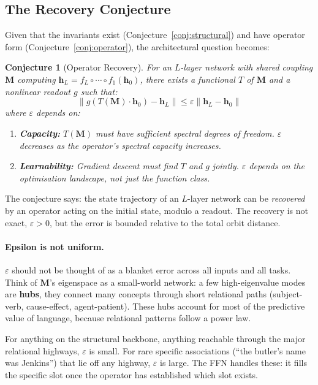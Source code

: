 \documentclass[11pt, a4paper]{article}
\newcommand{\M}{\mathbf{M}}
\newcommand{\h}{\mathbf{h}}
\newcommand{\norm}[1]{\left\| #1 \right\|}
\theoremstyle{plain}
\newtheorem{conjecture}{Conjecture}
\theoremstyle{definition}
\theoremstyle{remark}
\begin{document}
\subsection{The Recovery Conjecture}

Given that the invariants exist (Conjecture~\ref{conj:structural}) and have operator form (Conjecture~\ref{conj:operator}), the architectural question becomes:

\begin{conjecture}[Operator Recovery]
\label{conj:recovery}
For an $L$-layer network with shared coupling $\M$ computing $\h_L = f_L \circ \cdots \circ f_1(\h_0)$, there exists a functional $T$ of $\M$ and a nonlinear readout $g$ such that:
\begin{equation}
\norm{g(T(\M) \cdot \h_0) - \h_L} \leq \varepsilon \norm{\h_L - \h_0}
\end{equation}
where $\varepsilon$ depends on:
\begin{enumerate}[nosep]
\item \textbf{Capacity:} $T(\M)$ must have sufficient spectral degrees of freedom.
      $\varepsilon$ decreases as the operator's spectral capacity increases.
\item \textbf{Learnability:} Gradient descent must find $T$ and $g$ jointly.
      $\varepsilon$ depends on the optimisation landscape, not just the function class.
\end{enumerate}
\end{conjecture}

\noindent The conjecture says: the state trajectory of an $L$-layer network can be \emph{recovered} by an operator acting on the initial state, modulo a readout.
The recovery is not exact, $\varepsilon > 0$, but the error is bounded relative to the total orbit distance.

\paragraph{Epsilon is not uniform.}
$\varepsilon$ should not be thought of as a blanket error across all inputs and all tasks.
Think of $\M$'s eigenspace as a small-world network: a few high-eigenvalue modes are \textbf{hubs}, they connect many concepts through short relational paths (subject-verb, cause-effect, agent-patient).
These hubs account for most of the predictive value of language, because relational patterns follow a power law.

For anything on the structural backbone, anything reachable through the major relational highways, $\varepsilon$ is small.
For rare specific associations (``the butler's name was Jenkins'') that lie off any highway, $\varepsilon$ is large.
The FFN handles these: it fills the specific slot once the operator has established which slot exists.
\end{document}
